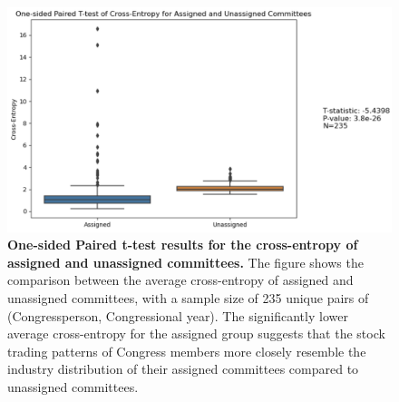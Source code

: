 \documentclass[15pt,letterpaper]{article}
\begin{document}

\begin{figure}[h!]
  \centering
  \includegraphics[width=1\textwidth]{imgs/onspt.png}
  \caption{\textbf{One-sided Paired t-test results for the cross-entropy of assigned and unassigned committees.} The figure shows the comparison between the average cross-entropy of assigned and unassigned committees, with a sample size of 235 unique pairs of (Congressperson, Congressional year). The significantly lower average cross-entropy for the assigned group suggests that the stock trading patterns of Congress members more closely resemble the industry distribution of their assigned committees compared to unassigned committees.}
  \label{fig:paired_ttest}
\end{figure}  
\end{document}
